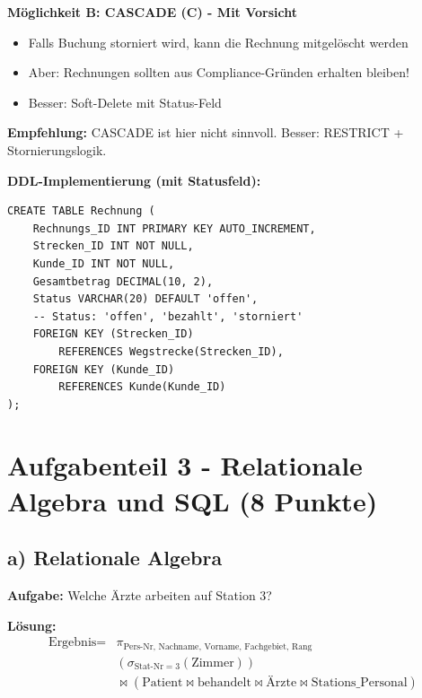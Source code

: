 \documentclass[12pt,a4paper]{article}
\begin{document}
\textbf{Möglichkeit B: CASCADE (C) - Mit Vorsicht}
\begin{itemize}
    \item Falls Buchung storniert wird, kann die Rechnung mitgelöscht werden
    \item Aber: Rechnungen sollten aus Compliance-Gründen erhalten bleiben!
    \item Besser: Soft-Delete mit Status-Feld
\end{itemize}

\textbf{Empfehlung:} CASCADE ist hier nicht sinnvoll. Besser: RESTRICT + Stornierungslogik.

\textbf{DDL-Implementierung (mit Statusfeld):}
\begin{verbatim}
CREATE TABLE Rechnung (
    Rechnungs_ID INT PRIMARY KEY AUTO_INCREMENT,
    Strecken_ID INT NOT NULL,
    Kunde_ID INT NOT NULL,
    Gesamtbetrag DECIMAL(10, 2),
    Status VARCHAR(20) DEFAULT 'offen',
    -- Status: 'offen', 'bezahlt', 'storniert'
    FOREIGN KEY (Strecken_ID) 
        REFERENCES Wegstrecke(Strecken_ID),
    FOREIGN KEY (Kunde_ID) 
        REFERENCES Kunde(Kunde_ID)
);
\end{verbatim}

\vspace{2cm}

\section*{Aufgabenteil 3 - Relationale Algebra und SQL (8 Punkte)}

\subsection*{a) Relationale Algebra}

\textbf{Aufgabe:} Welche Ärzte arbeiten auf Station 3?

\textbf{Lösung:}
\begin{align*}
\text{Ergebnis} = & \pi_{\text{Pers-Nr, Nachname, Vorname, Fachgebiet, Rang}} \\
& \left( \sigma_{\text{Stat-Nr} = 3} (\text{Zimmer}) \right) \\
& \bowtie (\text{Patient} \bowtie \text{behandelt} \bowtie \text{Ärzte} \bowtie \text{Stations\_Personal})
\end{align*}
\end{document}

